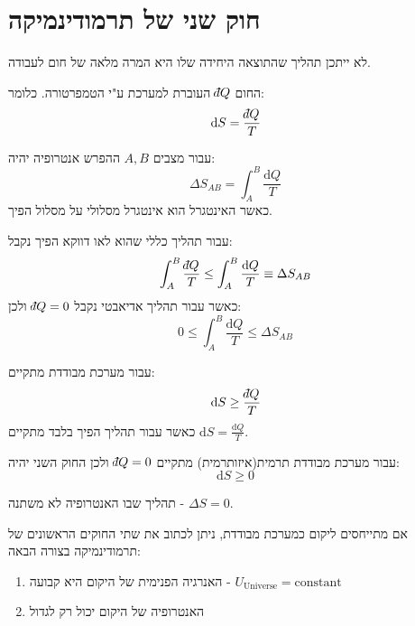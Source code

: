 \documentclass{tstextbook}
\begin{document}
\section{חוק שני של תרמודינמיקה}

\begin{theorem}
לא ייתכן תהליך שהתוצאה היחידה שלו היא המרה מלאה של חום לעבודה.

\end{theorem}
\begin{definition}[אנטרופיה]
החום \(\;\bar{}\mkern-7.5mu dQ\) העוברת למערכת ע"י הטמפרטורה. כלומר:
$$\mathrm{d}S = \frac{\;\bar{}\mkern-7.5mu dQ}{T}$$

\end{definition}
\begin{definition}
עבור מצבים \(A,B\) ההפרש אנטרופיה יהיה:
$$\Delta S_{AB}=\int_{A}^{B} \frac{\mathrm{d}Q}{T}  $$
כאשר האינטגרל הוא אינטגרל מסלולי על מסלול הפיך. 

\end{definition}
\begin{proposition}
עבור תהליך כללי שהוא לאו דווקא הפיך נקבל:
$$\int_{A}^{B}  \frac{\;\bar{}\mkern-7.5mu dQ}{T}\leq \int _{A}^{B } \frac{\mathrm{d}Q}{T}\equiv\Delta S_{AB}$$
כאשר עבור תהליך אדיאבטי נקבל \(\;\bar{}\mkern-7.5mu dQ=0\) ולכן:
$$0\leq  \int_{A}^{B}  \frac{\mathrm{d}Q}{T}\leq \Delta S_{AB} $$

\end{proposition}
\begin{proposition}
עבור מערכת מבודדת מתקיים:
$$\mathrm{d}S \geq \frac{\;\bar{}\mkern-7.5mu dQ}{T}$$
כאשר עבור תהליך הפיך בלבד מתקיים \(\mathrm{d}S = \frac{\mathrm{d}Q}{T}\).

\end{proposition}
\begin{corollary}
עבור מערכת מבודדת תרמית(איזותרמית) מתקיים \(\;\bar{}\mkern-7.5mu dQ=0\) ולכן החוק השני יהיה:
$$\mathrm{d}S \geq 0$$

\end{corollary}
\begin{definition}
תהליך שבו האנטרופיה לא משתנה - \(\Delta S=0\).

\end{definition}
\begin{corollary}
אם מתייחסים ליקום כמערכת מבודדת, ניתן לכתוב את שתי החוקים הראשונים של תרמודינמיקה בצורה הבאה:

  \begin{enumerate}
    \item האנרגיה הפנימית של היקום היא קבועה - \(U_{\mathrm{Universe}}=\mathrm{constant}\)


    \item האנטרופיה של היקום יכול רק לגדול 


  \end{enumerate}
\end{corollary}
\end{document}
